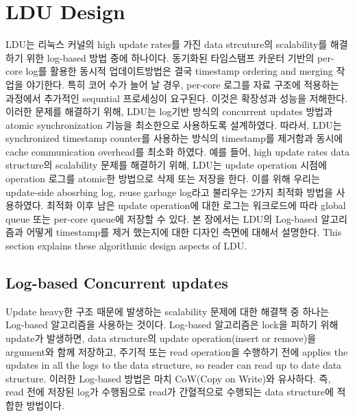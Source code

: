 \section{LDU Design}


\ifkor
LDU는 리눅스 커널의 high update rates를 가진 data strcuture의 scalability를
해결하기 위한 log-based 방법 중에 하나이다.
동기화된 타임스탬프 카운터 기반의 per-core log를 활용한 동시적 업데이트방법은 결국 timestamp ordering and
merging 작업을 야기한다.
특히 코어 수가 늘어 날 경우, per-core 로그를 자료 구조에 적용하는 과정에서 추가적인 sequntial 프로세싱이 요구된다.
이것은 확장성과 성능을 저해한다. 
이러한 문제를 해결하기 위해, LDU는 log기반 방식의 concurrent updates 방법과 atomic synchronization
기능을 최소한으로 사용하도록 설계하였다.
따라서, LDU는 synchronized timestamp counter를 사용하는 방식의 timestamp를 제거함과 동시에 cache
communication overhead를 최소화 하였다.
예를 들어, high update rates data structure의 scalability 문제를 해결하기 위해, LDU는 update
operation 시점에 operation 로그를 atomic한 방법으로 삭제 또는 저장을 한다.
이를 위해 우리는 update-side abosrbing log, reuse garbage log라고 불리우는 2가지 최적화 방법을
사용하였다.
최적화 이후 남은 update operation에 대한 로그는 워크로드에 따라 global queue 또는 per-core queue에 저장할
수 있다.
본 장에서는 LDU의 Log-based 알고리즘과 어떻게 timestamp를 제거 했는지에 대한 디자인 측면에 대해서
설명한다.
\else
This section explains these algorithmic design aspects of LDU.
\fi



\subsection{Log-based Concurrent updates}


\ifkor
Update heavy한 구조 때문에 발생하는 scalability 문제에 대한 해결책 중 하나는 Log-based 알고리즘을 사용하는 것이다.
Log-based 알고리즘은 lock을 피하기 위해 update가 발생하면, data structure의 update
operation(insert or remove)을 argument와 함께 저장하고, 주기적 또는 read operation을 수행하기 전에
applies the updates in all the logs to the data structure, so reader can read up to date data structure.
이러한 Log-based 방법은 마치 CoW(Copy on Write)와 유사하다.
즉, read 전에 저장된 log가 수행됨으로 read가 간혈적으로 수행되는 data structure에 적합한 방법이다.
\else

